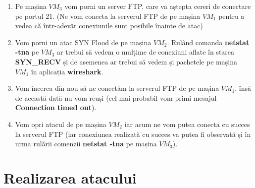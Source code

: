 \documentclass[a4paper]{article}
\begin{document}
\begin{enumerate}
    \item Pe mașina $ VM_3 $ vom porni un server FTP, care va aștepta cereri de conectare pe portul 21. (Ne vom conecta la serverul FTP de pe mașina $ VM_1 $ pentru a vedea că într-adevăr conexiunile sunt posibile înainte de atac)
    
    \item Vom porni un atac SYN Flood de pe mașina $ VM_2 $. Rulând comanda \textbf{netstat -tna} pe $ VM_3 $ ar trebui să vedem o mulțime de conexiuni aflate în starea \textbf{SYN\_RECV} și de asemenea ar trebui să vedem și pachetele pe mașina $ VM_1 $ în aplicația \textbf{wireshark}.
    
    \item Vom încerca din nou să ne conectăm la serverul FTP de pe mașina $ VM_1 $, însă de această dată nu vom reuși (cel mai probabil vom primi mesajul \textbf{Connection timed out}).
    
    \item Vom opri atacul de pe mașina $ VM_2 $ iar acum ne vom putea conecta cu succes la serverul FTP (iar conexiunea realizată cu succes va putea fi observată și în urma rulării comenzii \textbf{netstat -tna} pe mașina $ VM_3 $).

\end{enumerate}

\section{Realizarea atacului}
\end{document}
